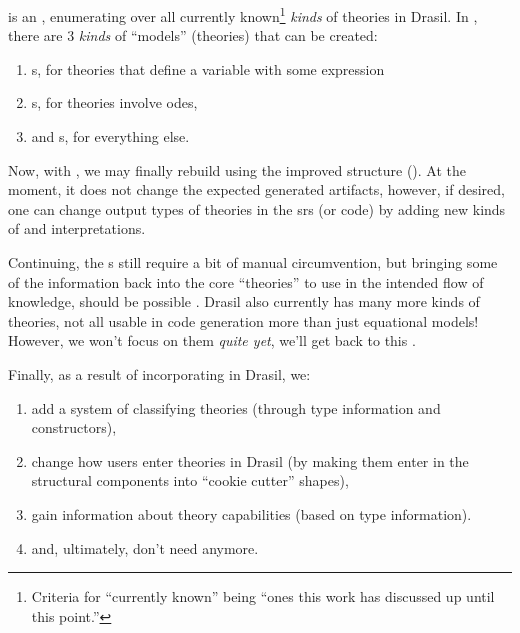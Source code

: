 \originalNewModelKindsHaskell{}

\ModelKinds{} is an , enumerating over all currently
known\footnote{Criteria for ``currently known'' being ``ones this work has
    discussed up until this point.''} \textit{kinds} of theories in Drasil. In
\ModelKinds{}, there are 3 \textit{kinds} of ``models'' (theories) that can be
created:

\begin{enumerate}
    \item \EquationalModel{}s, for theories that define a variable with some
          expression
    \item \DEModel{}s, for theories involve \acsp{ode},
    \item and \OthModel{}s, for everything else.
\end{enumerate}

Now, with \EquationalModel{}, we may finally rebuild  using
the improved structure (). At the moment, it does not
change the expected generated artifacts, however, if desired, one can change
output types of theories in the \acs{srs} (or code) by adding new kinds of
\QDefinition{} and \ModelKinds{} interpretations.

\originalLandPosIMQD{}

Continuing, the \DEModel{}s still require a bit of manual circumvention, but
bringing some of the information back into the core ``theories'' to use in the
intended flow of knowledge, should be possible \cite{Chen2022MEng}. Drasil also
currently has many more kinds of theories, not all usable in code generation
\textemdash{} more than just equational models! However, we won't focus on them
\textit{quite yet}, we'll get back to this .

Finally, as a result of incorporating \ModelKinds{} in Drasil, we:
\begin{enumerate}[label={(\alph*)}]
    \item add a system of classifying theories (through type information and
          constructors),
    \item change how users enter theories in Drasil (by making them enter in the
          structural components into ``cookie cutter'' shapes),
    \item gain information about theory capabilities (based on type
          information).
    \item and, ultimately, don't need \relToQD{} anymore.
\end{enumerate}

